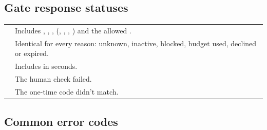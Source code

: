 \subsection{Gate response statuses}

\begin{tabularx}{\linewidth}{@{}L{3.2cm}Y@{}}
\toprule
{} & Includes , , ,  (, , , ) and the allowed . \\
 & Identical for every reason: unknown, inactive, blocked, budget used, declined or expired. \\
 & Includes  in seconds. \\
 & The human check failed. \\
 & The one-time code didn't match. \\
\bottomrule
\end{tabularx}

\subsection{Common error codes}

